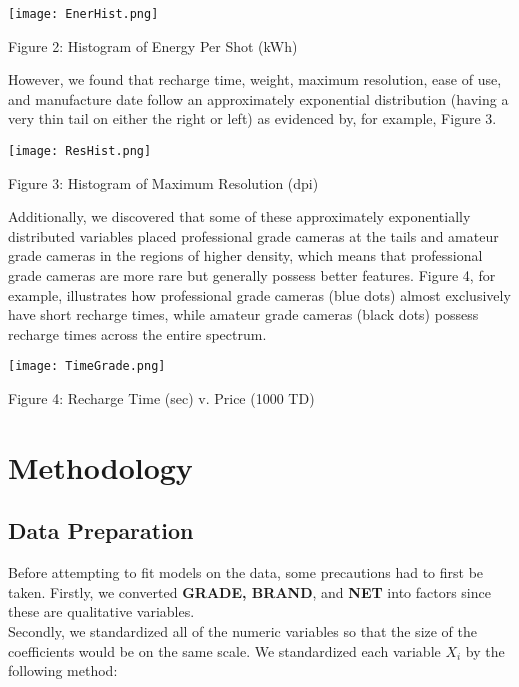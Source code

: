 \documentclass[12pt]{article}
\begin{document}
{\centering
\texttt{[image: EnerHist.png]}\par\smallskip}
{\centering
Figure 2: Histogram of Energy Per Shot (kWh)\par\bigskip}

\pagebreak
However, we found that recharge time, weight, maximum resolution, ease of use, and manufacture date follow an approximately exponential distribution (having a very thin tail on either the right or left) as evidenced by, for example, Figure 3.\\

{\centering
\texttt{[image: ResHist.png]} \par\smallskip}

{\centering 
Figure 3: Histogram of Maximum Resolution (dpi)\par\bigskip}

Additionally, we discovered that some of these approximately exponentially distributed variables placed professional grade cameras at the tails and amateur grade cameras in the regions of higher density, which means that professional grade cameras are more rare but generally possess better features. Figure 4, for example, illustrates how professional grade cameras (blue dots) almost exclusively have short recharge times, while amateur grade cameras (black dots) possess recharge times across the entire spectrum.\\

{\centering
\texttt{[image: TimeGrade.png]}\par\smallskip}

{\centering
Figure 4: Recharge Time (sec) v. Price (1000 TD)\par\bigskip}

\pagebreak
\section{Methodology}

\subsection{Data Preparation}
Before attempting to fit models on the data, some precautions had to first be taken. Firstly, we converted {\bf GRADE, BRAND}, and {\bf NET} into factors since these are qualitative variables.\\

Secondly, we standardized all of the numeric variables so that the size of the coefficients would be on the same scale. We standardized each variable $X_i$ by the following method:
\end{document}
